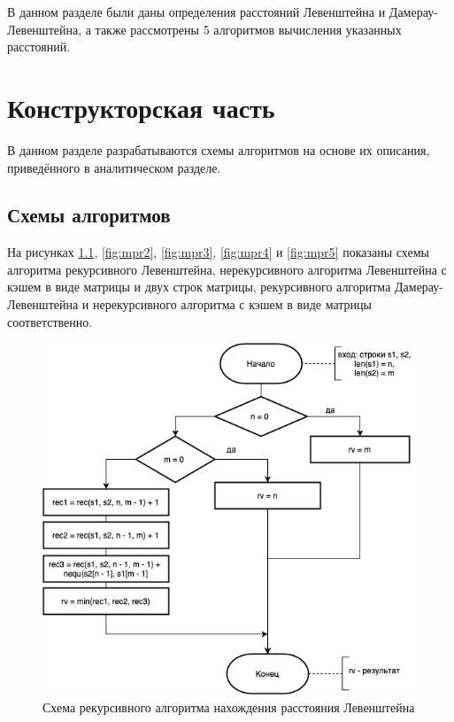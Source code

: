 \documentclass{report}
\begin{document}
В данном разделе были даны определения расстояний Левенштейна и Дамерау-Левенштейна, а также рассмотрены 5 алгоритмов вычисления указанных расстояний.
	
\clearpage

\chapter{Конструкторская часть}
В данном разделе разрабатываются схемы алгоритмов на основе их описания, приведённого в аналитическом разделе.
\section{Схемы алгоритмов}\label{schemes}

На рисунках \ref{fig:mpr1}, \ref{fig:mpr2}, \ref{fig:mpr3}, \ref{fig:mpr4} и \ref{fig:mpr5} показаны схемы алгоритма рекурсивного Левенштейна, нерекурсивного алгоритма Левенштейна с кэшем в виде матрицы и двух строк матрицы, рекурсивного алгоритма Дамерау-Левенштейна и нерекурсивного алгоритма с кэшем в виде матрицы соответственно.
\begin{figure}[h!p]\label{recLev}
	\centering
	\includegraphics[scale = 0.7]{recLev.drawio.png}
	\caption{Схема рекурсивного алгоритма нахождения расстояния Левенштейна}
	\label{fig:mpr1}
\end{figure}
\end{document}
